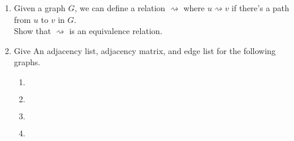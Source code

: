 \documentclass[basic, header]{nosvagor-notes}
\begin{document}
\begin{enumerate}
\item

Given a graph $G$, we can define a relation $\rightsquigarrow$ where
$u \rightsquigarrow v$ if there's a path from $u$ to $v$ in $G$.\\
Show that $\rightsquigarrow$ is an equivalence relation.

  \newpage %

\item

Give An adjacency list, adjacency matrix, and edge list for the following graphs.

\begin{enumerate}[itemsep=6em]
  \item $\ $\\ \house

  \item $\ $\\ \petersen

  \newpage %

  \item $\ $\\ \kfive

  \item $\ $\\ \kthreetwo

\end{enumerate}

\end{enumerate}
\end{document}
